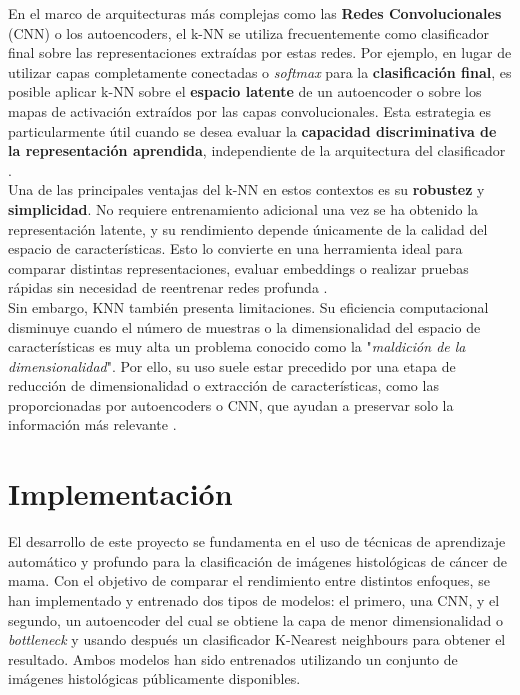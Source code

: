 \documentclass[12pt]{article} %
\begin{document}
En el marco de arquitecturas más complejas como las \textbf{Redes Convolucionales} (CNN) o los autoencoders, el k-NN se utiliza frecuentemente como clasificador final sobre las representaciones extraídas por estas redes. Por ejemplo, en lugar de utilizar capas completamente conectadas o \textit{softmax} para la \textbf{clasificación final}, es posible aplicar k-NN sobre el \textbf{espacio latente} de un autoencoder o sobre los mapas de activación extraídos por las capas convolucionales. Esta estrategia es particularmente útil cuando se desea evaluar la \textbf{capacidad discriminativa de la representación aprendida}, independiente de la arquitectura del clasificador \cite{van2009dimensionality}. \\

Una de las principales ventajas del k-NN en estos contextos es su \textbf{robustez} y \textbf{simplicidad}. No requiere entrenamiento adicional una vez se ha obtenido la representación latente, y su rendimiento depende únicamente de la calidad del espacio de características. Esto lo convierte en una herramienta ideal para comparar distintas representaciones, evaluar embeddings o realizar pruebas rápidas sin necesidad de reentrenar redes profunda \cite{bengio2013representation}. \\

Sin embargo, KNN también presenta limitaciones. Su eficiencia computacional disminuye cuando el número de muestras o la dimensionalidad del espacio de características es muy alta un problema conocido como la "\textit{maldición de la dimensionalidad}". Por ello, su uso suele estar precedido por una etapa de reducción de dimensionalidad o extracción de características, como las proporcionadas por autoencoders o CNN, que ayudan a preservar solo la información más relevante \cite{aggarwal2014data}. \\

\newpage
\section{Implementación}
El desarrollo de este proyecto se fundamenta en el uso de técnicas de aprendizaje automático y profundo para la clasificación de imágenes histológicas de cáncer de mama. Con el objetivo de comparar el rendimiento entre distintos enfoques, se han implementado y entrenado dos tipos de modelos: el primero, una CNN, y el segundo, un autoencoder del cual se obtiene la capa de menor dimensionalidad o \textit{bottleneck} y usando después un clasificador K-Nearest neighbours para obtener el resultado. Ambos modelos han sido entrenados utilizando un conjunto de imágenes histológicas públicamente disponibles.\\
\end{document}
